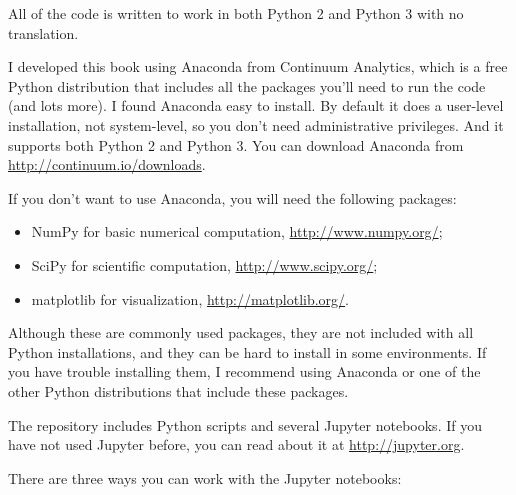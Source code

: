\documentclass[12pt]{book}
\theoremstyle{exercise}
\begin{document}
All of the code is written to work in both Python 2 and Python 3
with no translation.

I developed this book using Anaconda from Continuum Analytics, which
is a free Python distribution that includes all the packages you'll
need to run the code (and lots more).  I found Anaconda easy to
install.  By default it does a user-level installation, not
system-level, so you don't need administrative privileges.  And it
supports both Python 2 and Python 3.  You can download Anaconda from
\url{http://continuum.io/downloads}.


If you don't want to use Anaconda, you will need the following
packages:

\begin{itemize}

\item NumPy for basic numerical computation, \url{http://www.numpy.org/};

\item SciPy for scientific computation,
  \url{http://www.scipy.org/};

\item matplotlib for visualization, \url{http://matplotlib.org/}.

\end{itemize}

Although these are commonly used packages, they are not included with
all Python installations, and they can be hard to install in some
environments.  If you have trouble installing them, I
recommend using Anaconda or one of the other Python distributions
that include these packages.


The repository includes Python scripts and several Jupyter
notebooks.  If you have not used Jupyter before, you can read about
it at \url{http://jupyter.org}.


There are three ways you can work with the Jupyter notebooks:
\end{document}
